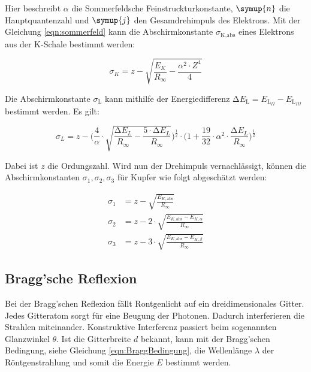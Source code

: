 Hier beschreibt $\alpha$ die Sommerfeldsche Feinstruckturkonstante, $\symup{n}$ die Hauptquantenzahl und $\symup{j}$ den Gesamdrehimpuls des Elektrons.
Mit der Gleichung \eqref{eqn:sommerfeld} kann die Abschirmkonstante $\sigma_\text{K,abs}$ eines Elektrons aus der K-Schale bestimmt werden:

\begin{equation}\label{eqn:absorptionskoeff}
    \sigma_K = z - \sqrt{\frac{E_K}{R_\infty} - \frac{\alpha^2 \cdot Z^4}{4}}
\end{equation}

Die Abschirmkonstante $\sigma_\text{L}$ kann mithilfe der Energiedifferenz $\increment E_\text{L} = E_\text{L}_{II} -E_\text{L}_{III}$ bestimmt werden.
Es gilt:

\begin{equation}
    \sigma_L = z -\Biggl( \frac{4}{\alpha} \cdot \sqrt{\frac{\increment E_L}{R_\infty} - \frac{5 \cdot \increment E_L}{R_\infty}} \Biggr)^{\frac{1}{2}}
                \cdot \Biggl(1 + \frac{19}{32} \cdot \alpha^2 \cdot \frac{\increment E_L}{R_\infty} \Biggr)^{\frac{1}{2}}
\end{equation}

Dabei ist $z$ die Ordungszahl.
Wird nun der Drehimpuls vernachlässigt, können die Abschirmkonstanten $\sigma_1, \sigma_2, \sigma_3$ für Kupfer wie folgt abgeschätzt werden:

\begin{align}
    \sigma_1 &= z - \sqrt{\frac{E_{K,\text{abs}}}{R_\infty}} \label{eq:sigma1} \\
    \sigma_2 &= z - 2 \cdot \sqrt{\frac{E_{K,\text{abs}} - E_{K, \alpha}}{R_\infty}} \label{eq:sigma2} \\
    \sigma_3 &= z - 3 \cdot \sqrt{\frac{E_{K,\text{abs}} - E_{K, \beta}}{R_\infty}} \label{eq:sigma3} 
\end{align}

\subsection{Bragg'sche Reflexion}
\label{subsec:Bragg}

Bei der Bragg'schen Reflexion fällt Rontgenlicht auf ein dreidimensionales Gitter.
Jedes Gitteratom sorgt für eine Beugung der Photonen.
Dadurch interferieren die Strahlen miteinander.
Konstruktive Interferenz passiert beim sogenannten Glanzwinkel $\theta$.
Ist die Gitterbreite $d$ bekannt, kann mit der Bragg'schen Bedingung, siehe Gleichung \eqref{eqn:BraggBedingung},
die Wellenlänge $\lambda$ der Röntgenstrahlung und somit die Energie $E$ bestimmt werden.

